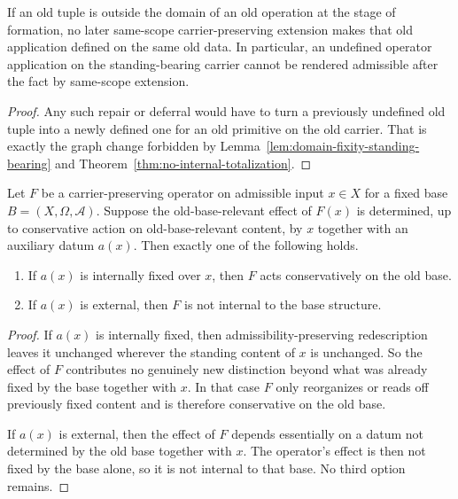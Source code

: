 \begin{corollary}
\label{cor:no-posthoc-repair-no-deferred-admissibility}
If an old tuple is outside the domain of an old operation at the stage of formation, no later same-scope carrier-preserving extension makes that old application defined on the same old data. In particular, an undefined operator application on the standing-bearing carrier cannot be rendered admissible after the fact by same-scope extension.
\end{corollary}

\begin{proof}
Any such repair or deferral would have to turn a previously undefined old tuple into a newly defined one for an old primitive on the old carrier. That is exactly the graph change forbidden by Lemma~\ref{lem:domain-fixity-standing-bearing} and Theorem~\ref{thm:no-internal-totalization}.
\end{proof}

\begin{theorem}
\label{thm:aux-data-dichotomy}
Let $F$ be a carrier-preserving operator on admissible input $x\in X$ for a fixed base $B=(X,\Omega,\mathcal A)$. Suppose the old-base-relevant effect of $F(x)$ is determined, up to conservative action on old-base-relevant content, by $x$ together with an auxiliary datum $a(x)$. Then exactly one of the following holds.
\begin{enumerate}
  \item If $a(x)$ is internally fixed over $x$, then $F$ acts conservatively on the old base.
  \item If $a(x)$ is external, then $F$ is not internal to the base structure.
\end{enumerate}
\end{theorem}

\begin{proof}
If $a(x)$ is internally fixed, then admissibility-preserving redescription leaves it unchanged wherever the standing content of $x$ is unchanged. So the effect of $F$ contributes no genuinely new distinction beyond what was already fixed by the base together with $x$. In that case $F$ only reorganizes or reads off previously fixed content and is therefore conservative on the old base.

If $a(x)$ is external, then the effect of $F$ depends essentially on a datum not determined by the old base together with $x$. The operator's effect is then not fixed by the base alone, so it is not internal to that base. No third option remains.
\end{proof}


